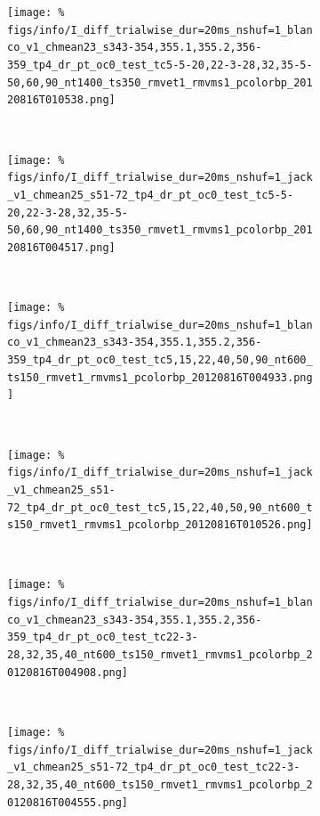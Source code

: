 \begin{figure}[htbp]
    \begin{subfigure}[b]{0.5\linewidth}
        \centering
        \caption{}
        \label{fig:b1-alldif}
        \texttt{[image: \%
figs/info/I\_diff\_trialwise\_dur=20ms\_nshuf=1\_blanco\_v1\_chmean23\_s343-354,355.1,355.2,356-359\_tp4\_dr\_pt\_oc0\_test\_tc5-5-20,22-3-28,32,35-5-50,60,90\_nt1400\_ts350\_rmvet1\_rmvms1\_pcolorbp\_20120816T010538.png]}
    \end{subfigure}
    ~~
    \begin{subfigure}[b]{0.5\linewidth}
        \centering
        \caption{}
        \label{fig:j1-alldif}
        \texttt{[image: \%
figs/info/I\_diff\_trialwise\_dur=20ms\_nshuf=1\_jack\_v1\_chmean25\_s51-72\_tp4\_dr\_pt\_oc0\_test\_tc5-5-20,22-3-28,32,35-5-50,60,90\_nt1400\_ts350\_rmvet1\_rmvms1\_pcolorbp\_20120816T004517.png]}
    \end{subfigure}
    \\
    \begin{subfigure}[b]{0.5\linewidth}
        \centering
        \caption{}
        \label{fig:b1-cdif}
        \texttt{[image: \%
figs/info/I\_diff\_trialwise\_dur=20ms\_nshuf=1\_blanco\_v1\_chmean23\_s343-354,355.1,355.2,356-359\_tp4\_dr\_pt\_oc0\_test\_tc5,15,22,40,50,90\_nt600\_ts150\_rmvet1\_rmvms1\_pcolorbp\_20120816T004933.png]}
    \end{subfigure}
    ~~
    \begin{subfigure}[b]{0.5\linewidth}
        \centering
        \caption{}
        \label{fig:j1-cdif}
        \texttt{[image: \%
figs/info/I\_diff\_trialwise\_dur=20ms\_nshuf=1\_jack\_v1\_chmean25\_s51-72\_tp4\_dr\_pt\_oc0\_test\_tc5,15,22,40,50,90\_nt600\_ts150\_rmvet1\_rmvms1\_pcolorbp\_20120816T010526.png]}
    \end{subfigure}
    \\
    \begin{subfigure}[b]{0.5\linewidth}
        \centering
        \caption{}
        \label{fig:b1-fdif}
        \texttt{[image: \%
figs/info/I\_diff\_trialwise\_dur=20ms\_nshuf=1\_blanco\_v1\_chmean23\_s343-354,355.1,355.2,356-359\_tp4\_dr\_pt\_oc0\_test\_tc22-3-28,32,35,40\_nt600\_ts150\_rmvet1\_rmvms1\_pcolorbp\_20120816T004908.png]}
    \end{subfigure}
    ~~
    \begin{subfigure}[b]{0.5\linewidth}
        \centering
        \caption{}
        \label{fig:j1-fdif}
        \texttt{[image: \%
figs/info/I\_diff\_trialwise\_dur=20ms\_nshuf=1\_jack\_v1\_chmean25\_s51-72\_tp4\_dr\_pt\_oc0\_test\_tc22-3-28,32,35,40\_nt600\_ts150\_rmvet1\_rmvms1\_pcolorbp\_20120816T004555.png]}

\end{subfigure}
\end{figure}
